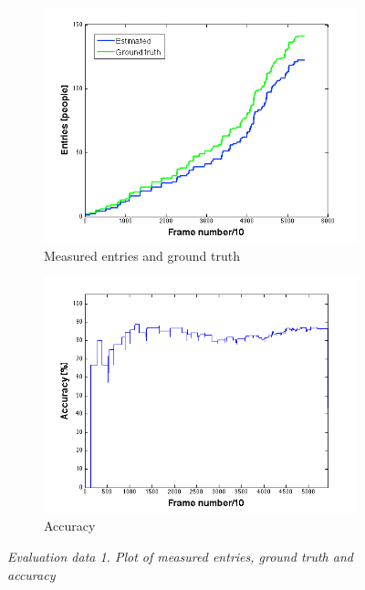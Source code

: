 \begin{figure}[H]
\centering
\begin{subfigure}{.5\textwidth}
  \centering
  \includegraphics[width=1.1\linewidth]{images/EntriesEval.png}
  \caption{Measured entries and ground truth}
  \label{fig:sub1}
\end{subfigure}%
\begin{subfigure}{.5\textwidth}
  \centering
  \includegraphics[width=1.1\linewidth]{images/AccEntriesEval.png}
  \caption{Accuracy}
  \label{fig:sub2}
\end{subfigure}
\caption[Entries evaluation]{\textit{Evaluation data 1. Plot of measured entries, ground truth and accuracy}}
\label{fig:Entries evaluation}
\end{figure}

